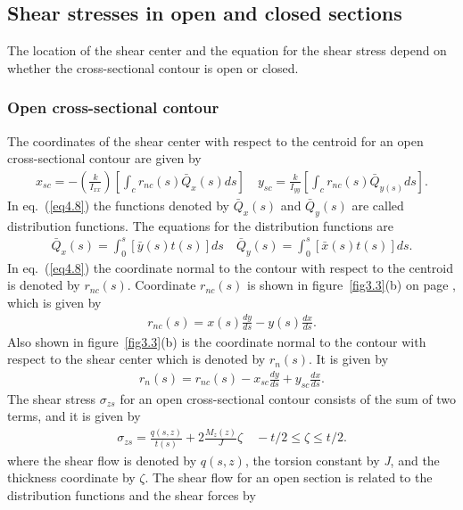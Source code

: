 \documentclass{AeroStructure-ERJohnson}
\begin{document}
\subsection{Shear stresses in open and closed sections}\label{sec4.1.2}

The location of the shear center and the equation for the shear stress depend on whether the cross-sectional contour is open or closed.

\subsubsection*{Open cross-sectional contour} The coordinates of the shear center with respect to the centroid for an open cross-sectional contour are given by
\begin{align}\label{eq4.8}
x_{s c}=-\left(\frac{k}{I_{x x}}\right)\left[\int_{c} r_{n c}(s) \bar{Q}_{x}(s) d s\right] \quad y_{s c}=\frac{k}{I_{y y}}\left[\int_{c} r_{n c}(s) \bar{Q}_{y(s)} d s\right].
\end{align}
In eq.~(\ref{eq4.8}) the functions denoted by $\bar{Q}_{x}(s)$ and $\bar{Q}_{y}(s)$ are called distribution functions. The equations for the distribution functions are
\begin{align}\label{eq4.9}
\bar{Q}_{x}(s)=\int_{0}^{s}[\bar{y}(s) t(s)] d s \quad \bar{Q}_{y}(s)=\int_{0}^{s}[\bar{x}(s) t(s)] d s.
\end{align}
In eq.~(\ref{eq4.8}) the coordinate normal to the contour with respect to the centroid is denoted by $r_{n c}(s)$. Coordinate $r_{n c}(s)$ is shown in figure~\ref{fig3.3}(b) on page \pageref{fig3.3}, which is given by
\begin{align}\label{eq4.10}
r_{n c}(s)=x(s) \frac{d y}{d s}-y(s) \frac{d x}{d s}.
\end{align}
Also shown in figure~\ref{fig3.3}(b) is the coordinate normal to the contour with respect to the shear center which is denoted by $r_{n}(s)$. It is given by
\begin{align}\label{eq4.11}
r_{n}(s)=r_{n c}(s)-x_{s c} \frac{d y}{d s}+y_{s c} \frac{d x}{d s}.
\end{align}
The shear stress $\sigma_{z s}$ for an open cross-sectional contour consists of the sum of two terms, and it is given by
\begin{align}\label{eq4.12}
\sigma_{z s}=\frac{q(s, z)}{t(s)}+2 \frac{M_{z}(z)}{J} \zeta \quad-t/2 \leq \zeta \leq t/2.
\end{align}
where the shear flow is denoted by $q(s, z)$, the torsion constant by \textit{J}, and the thickness coordinate by $\zeta$. The shear flow for an open section is related to the distribution functions and the shear forces by
\end{document}
